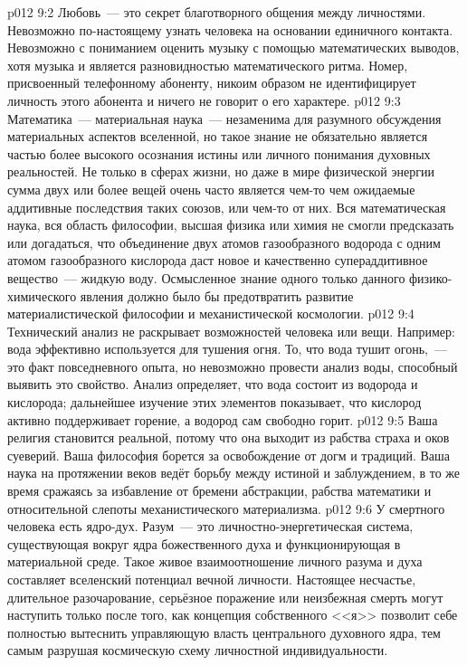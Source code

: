 \vs p012 9:2 \pc Любовь~--- это секрет благотворного общения между личностями. Невозможно по\hyp{}настоящему узнать человека на основании единичного контакта. Невозможно с пониманием оценить музыку с помощью математических выводов, хотя музыка и является разновидностью математического ритма. Номер, присвоенный телефонному абоненту, никоим образом не идентифицирует личность этого абонента и ничего не говорит о его характере.
\vs p012 9:3 Математика~--- материальная наука~--- незаменима для разумного обсуждения материальных аспектов вселенной, но такое знание не обязательно является частью более высокого осознания истины или личного понимания духовных реальностей. Не только в сферах жизни, но даже в мире физической энергии сумма двух или более вещей очень часто является чем\hyp{}то  чем ожидаемые аддитивные последствия таких союзов, или чем\hyp{}то  от них. Вся математическая наука, вся область философии, высшая физика или химия не смогли предсказать или догадаться, что объединение двух атомов газообразного водорода с одним атомом газообразного кислорода даст новое и качественно супераддитивное вещество~--- жидкую воду. Осмысленное знание одного только данного физико\hyp{}химического явления должно было бы предотвратить развитие материалистической философии и механистической космологии.
\vs p012 9:4 Технический анализ не раскрывает возможностей человека или вещи. Например: вода эффективно используется для тушения огня. То, что вода тушит огонь,~--- это факт повседневного опыта, но невозможно провести анализ воды, способный выявить это свойство. Анализ определяет, что вода состоит из водорода и кислорода; дальнейшее изучение этих элементов показывает, что кислород активно поддерживает горение, а водород сам свободно горит.
\vs p012 9:5 Ваша религия становится реальной, потому что она выходит из рабства страха и оков суеверий. Ваша философия борется за освобождение от догм и традиций. Ваша наука на протяжении веков ведёт борьбу между истиной и заблуждением, в то же время сражаясь за избавление от бремени абстракции, рабства математики и относительной слепоты механистического материализма.
\vs p012 9:6 \pc У смертного человека есть ядро\hyp{}дух. Разум~--- это личностно\hyp{}энергетическая система, существующая вокруг ядра божественного духа и функционирующая в материальной среде. Такое живое взаимоотношение личного разума и духа составляет вселенский потенциал вечной личности. Настоящее несчастье, длительное разочарование, серьёзное поражение или неизбежная смерть могут наступить только после того, как концепция собственного <<я>> позволит себе полностью вытеснить управляющую власть центрального духовного ядра, тем самым разрушая космическую схему личностной индивидуальности.

